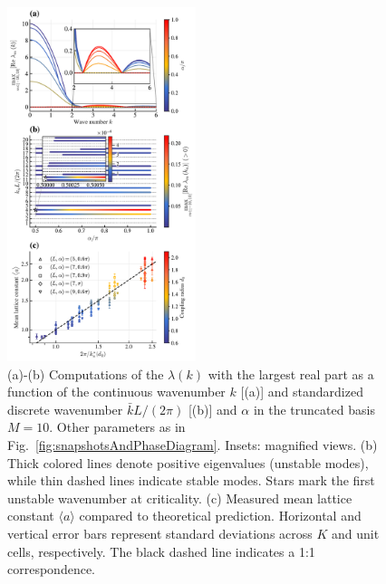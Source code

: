 \documentclass{article}
\begin{document}
\begin{figure}
    \centering
    \includegraphics[width=0.49\textwidth]{./figs/eigenvaluesAndLatticeConstants.pdf}
    \caption{
        \label{fig:eigenvaluesAndLatticeConstants}
        (a)-(b) Computations of the $\lambda(k)$ with the largest real part as a function of the continuous wavenumber $k$ [(a)] and standardized discrete wavenumber $\bar{k}L/(2\pi)$ [(b)] and $\alpha$ in the truncated basis $M=10$. Other parameters as in Fig.~\ref{fig:snapshotsAndPhaseDiagram}. Insets: magnified views.
        (b) Thick colored lines denote positive eigenvalues (unstable modes), while thin dashed lines indicate stable modes. Stars mark the first unstable wavenumber at criticality. (c) Measured mean lattice constant $\langle a \rangle$ compared to theoretical prediction. Horizontal and vertical error bars represent standard deviations across $K$ and unit cells, respectively. The black dashed line indicates a 1:1 correspondence.
    }
\end{figure}
\end{document}
